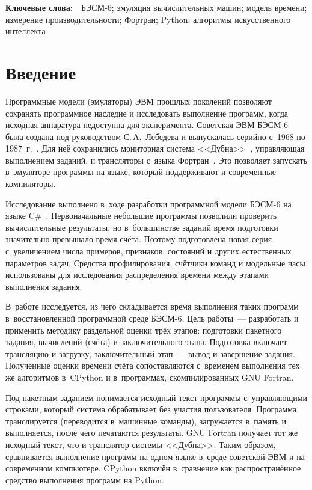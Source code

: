 \documentclass[a4paper,12pt]{article}
\def\KW#1{
\begin{center}\small
\parbox{150mm}{
\textbf{Ключевые слова:}\ \ #1}
\end{center}}
\begin{document}
\KW{БЭСМ-6; эмуляция вычислительных машин; модель времени; измерение производительности; Фортран; Python; алгоритмы искусственного интеллекта}


\section{Введение}

Программные модели (эмуляторы) ЭВМ прошлых поколений позволяют сохранять программное наследие и исследовать выполнение программ, когда исходная аппаратура недоступна для эксперимента. Советская ЭВМ БЭСМ-6 была создана под руководством С.\,А.~Лебедева и выпускалась серийно с~1968 по 1987~г.~\cite{bre}. Для неё сохранились мониторная система <<Дубна>>~\cite{dubna}, управляющая выполнением заданий, и трансляторы с~языка Фортран~\cite{saltykov}. Это позволяет запускать в~эмуляторе программы на языке, который поддерживают и современные компиляторы.

Исследование выполнено в~ходе разработки программной модели БЭСМ-6 на языке C\#~\cite{besm6net}. Первоначальные небольшие программы позволили проверить вычислительные результаты, но в~большинстве заданий время подготовки значительно превышало время счёта. Поэтому подготовлена новая серия с~увеличением числа примеров, признаков, состояний и других естественных параметров задач. Средства профилирования, счётчики команд и модельные часы использованы для исследования распределения времени между этапами выполнения задания.

В~работе исследуется, из чего складывается время выполнения таких программ в~восстановленной программной среде БЭСМ-6. Цель работы~--- разработать и применить методику раздельной оценки трёх этапов: подготовки пакетного задания, вычислений (счёта) и заключительного этапа. Подготовка включает трансляцию и загрузку, заключительный этап~--- вывод и завершение задания. Полученные оценки времени счёта сопоставляются с~временем выполнения тех же алгоритмов в~CPython и в~программах, скомпилированных GNU Fortran.

Под пакетным заданием понимается исходный текст программы с~управляющими строками, который система обрабатывает без участия пользователя. Программа транслируется (переводится в~машинные команды), загружается в~память и выполняется, после чего печатаются результаты. GNU Fortran получает тот же исходный текст, что и транслятор системы <<Дубна>>. Таким образом, сравнивается выполнение программ на одном языке в~среде советской ЭВМ и на современном компьютере. CPython включён в~сравнение как распространённое средство выполнения программ на Python.
\end{document}
